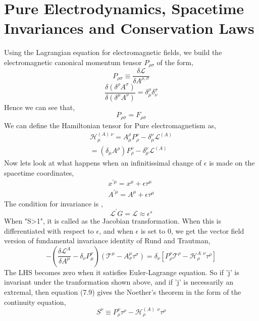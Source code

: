 \section{Pure Electrodynamics, Spacetime Invariances and Conservation Laws}
Using the Lagrangian equation for electromagnetic fields, we build the electromagnetic canonical momentum tensor $P_{\rho \sigma}$ of the form, 
\begin{equation}
    P_{\rho \sigma } \equiv \frac {\delta \mathcal{L}}{\delta A^{\rho,\sigma}}
\end{equation}
\begin{equation}
    \frac{\delta (\delta ^{\rho} A^{\sigma})}{\delta (\delta ^{\mu} A^{\nu})} = \delta ^{\rho} _{\mu} \delta^{\sigma}_{\nu}
\end{equation}
Hence we can see that, 
\begin{equation}
    P_{\rho \sigma} = F_{\rho \sigma}
\end{equation}
We can define the Hamiltonian tensor for Pure electromagnetism as, 
\begin{gather}
   \mathcal{H}^{(A) \: \nu}_{\mu} = A^{\rho}_{\mu} P^{\nu}_{\rho}- \delta_{\mu}^{\nu} \mathcal{L}^{(A)} \\
 = (\delta_{\mu} A^{\rho} ) F_{\rho} ^{\nu} - \delta _{\mu}^{\nu} \mathcal{L}^{(A)}
\end{gather}
Now lets look at what happens when an infinitissimal change of $\epsilon$ is made on the spacetime coordinates, 
\begin{gather}
    x^{' \mu} = x^{\mu} + \epsilon  \tau^{\mu} \\
     A ^{' \mu} = A^{\mu} + \epsilon  \tau^{\mu}
\end{gather}
The condition for invariance is , 
\begin{equation}
    \mathcal{L}^{'} G = \mathcal{L} \approx \epsilon^{s}
\end{equation}
When "S>1", it is called as the Jacobian transformation. When this is differentiated with respect to $\epsilon$, and when $\epsilon$ is set to 0, we get the vector field version of fundamental invariance identity of Rund and Trautman, 
\begin{equation}
    -(\frac{\delta \mathcal{L}^{A}}{\delta A^{\mu}} - \delta_{\nu} P_{\mu}^{\nu}) (\mathcal{T}^{\mu} - A^{\mu}_{\sigma} \tau^{\sigma}) = \delta_{\nu}[P_{\rho}^{\nu} \mathcal{T}^{\rho} - \mathcal{H}^{A \: \: \nu}_{\rho} \tau^{\rho} ]
\end{equation}
The LHS becomes zero when it satisfies Euler-Lagrange equation. So if 'j' is invariant under the tranformation shown above, and if 'j' is necessarily an extremal, then equation (7.9) gives the Noether's theorem in the form of the continuity equation, 
\begin{equation}
    S^{\nu} \equiv P_{\rho} ^{\nu} \tau ^{\rho} - \mathcal{H}^{(A)\: \: \nu}_{\rho} \tau ^{\rho}
\end{equation}





